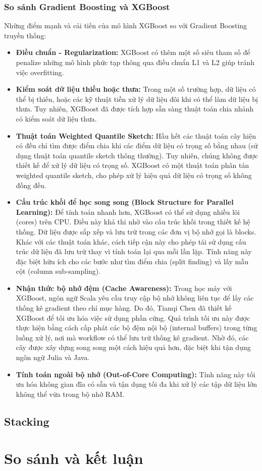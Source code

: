 \subsubsection*{So sánh Gradient Boosting và XGBoost}
Những điểm mạnh và cải tiến của mô hình XGBoost so với Gradient Boosting truyền thống:
\begin{itemize}
    \item \textbf{Điều chuẩn - Regularization:} XGBoost có thêm một số siêu tham số để penalize những mô hình phức tạp thông qua điều chuẩn L1 và L2 giúp tránh việc overfitting.
    \item \textbf{Kiểm soát dữ liệu thiếu hoặc thưa:} Trong một số trường hợp, dữ liệu có thể bị thiếu, hoặc các kỹ thuật tiền xử lý dữ liệu đôi khi có thể làm dữ liệu bị thưa. Tuy nhiên, XGBoost đã được tích hợp sẵn sàng thuật toán chia nhánh có kiểm soát dữ liệu thưa.
    \item \textbf{Thuật toán Weighted Quantile Sketch:} Hầu hết các thuật toán cây hiện có đều chỉ tìm được điểm chia khi các điểm dữ liệu có trọng số bằng nhau (sử dụng thuật toán quantile sketch thông thường). Tuy nhiên, chúng không được thiết kế để xử lý dữ liệu có trọng số. XGBoost có một thuật toán phân tán weighted quantile sketch, cho phép xử lý hiệu quả dữ liệu có trọng số không đồng đều.
    \item \textbf{Cấu trúc khối để học song song (Block Structure for Parallel Learning):} Để tính toán nhanh hơn, XGBoost có thể sử dụng nhiều lõi (cores) trên CPU. Điều này khả thi nhờ vào cấu trúc khối trong thiết kế hệ thống. Dữ liệu được sắp xếp và lưu trữ trong các đơn vị bộ nhớ gọi là blocks. Khác với các thuật toán khác, cách tiếp cận này cho phép tái sử dụng cấu trúc dữ liệu đã lưu trữ thay vì tính toán lại qua mỗi lần lặp. Tính năng này đặc biệt hữu ích cho các bước như tìm điểm chia (split finding) và lấy mẫu cột (column sub-sampling).
    \item \textbf{Nhận thức bộ nhớ đệm (Cache Awareness):} Trong học máy với XGBoost, ngôn ngữ Scala yêu cầu truy cập bộ nhớ không liên tục để lấy các thống kê gradient theo chỉ mục hàng. Do đó, Tianqi Chen đã thiết kế XGBoost để tối ưu hóa việc sử dụng phần cứng. Quá trình tối ưu này được thực hiện bằng cách cấp phát các bộ đệm nội bộ (internal buffers) trong từng luồng xử lý, nơi mà workflow có thể lưu trữ thống kê gradient. Nhờ đó, các cây được xây dựng song song một cách hiệu quả hơn, đặc biệt khi tận dụng ngôn ngữ Julia và Java.
    \item \textbf{Tính toán ngoài bộ nhớ (Out-of-Core Computing):} Tính năng này tối ưu hóa không gian đĩa có sẵn và tận dụng tối đa khi xử lý các tập dữ liệu lớn không thể vừa trong bộ nhớ RAM.
\end{itemize}

\subsection{Stacking}
\section{So sánh và kết luận}